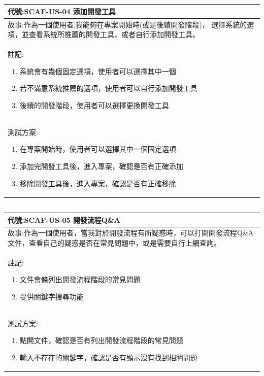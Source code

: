 \documentclass{report}
\begin{document}
\subsection*{}
\fontsize{12}{20}\selectfont
\begin{tabularx}{\textwidth}{|X|}
  \hline
  代號:SCAF-US-04 添加開發工具 \\
  \hline
  故事:作為一個使用者,我能夠在專案開始時(或是後續開發階段)， 選擇系統的選項，並查看系統所推薦的開發工具，或者自行添加開發工具。 \\
  \hline
  註記:
  \begin{enumerate}
    \item 系統會有幾個固定選項，使用者可以選擇其中一個
    \item 若不滿意系統推薦的選項，使用者可以自行添加開發工具
    \item 後續的開發階段，使用者可以選擇更換開發工具
  \end{enumerate} \\
  \hline
  測試方案:
  \begin{enumerate}
    \item 在專案開始時，使用者可以選擇其中一個固定選項
    \item 添加完開發工具後，進入專案，確認是否有正確添加
    \item 移除開發工具後，進入專案，確認是否有正確移除
  \end{enumerate} \\
  \hline
\end{tabularx}

\subsection*{}
\fontsize{12}{20}\selectfont
\begin{tabularx}{\textwidth}{|X|}
  \hline
  代號:SCAF-US-05 開發流程Q\&A \\
  \hline
  故事:作為一個使用者，當我對於開發流程有所疑惑時，可以打開開發流程Q\&A文件，查看自己的疑惑是否在常見問題中，或是需要自行上網查詢。 \\
  \hline
  註記:
  \begin{enumerate}
    \item 文件會條列出開發流程階段的常見問題
    \item 提供關鍵字搜尋功能
  \end{enumerate} \\
  \hline
  測試方案:
  \begin{enumerate}
    \item 點開文件，確認是否有列出開發流程階段的常見問題
    \item 輸入不存在的關鍵字，確認是否有顯示沒有找到相關問題
  \end{enumerate} \\
  \hline
\end{tabularx}
\end{document}
